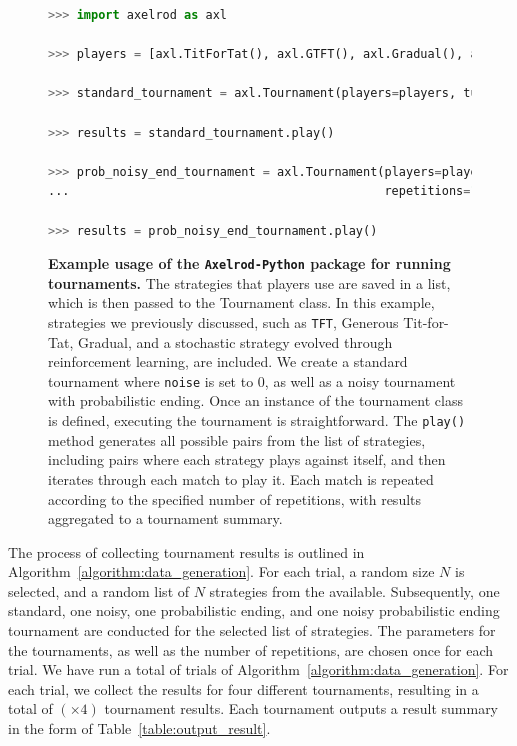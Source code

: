 \documentclass{article}
\newcommand{\uniquenumberofseeds}{}
\newcommand{\numberofalltournaments}{}
\newcommand{\numberofstrategies}{}
\def\axelrod{\texttt{Axelrod-Python}}
\def\TFT{\texttt{TFT}}
\begin{document}
\begin{figure}
\begin{lstlisting}[language=Python]
>>> import axelrod as axl

>>> players = [axl.TitForTat(), axl.GTFT(), axl.Gradual(), axl.EvolvedLookerUp2_2_2()]

>>> standard_tournament = axl.Tournament(players=players, turns=50, repetitions=10, noise=0)

>>> results = standard_tournament.play()

>>> prob_noisy_end_tournament = axl.Tournament(players=players, prob_end=0.5,
...                                            repetitions=10, noise=0.001)

>>> results = prob_noisy_end_tournament.play()
\end{lstlisting}
\caption{{\bf Example usage of the \axelrod{} package for running tournaments.}
The strategies that players use are saved in a list, which is then passed to the
Tournament class. In this example, strategies we previously discussed, such as \TFT, Generous Tit-for-Tat, Gradual, and a stochastic strategy
evolved through reinforcement learning, are included. We create a standard
tournament where \texttt{noise} is set to 0, as
well as a noisy tournament with probabilistic ending. Once an instance of the
tournament class is defined, executing the tournament is straightforward. The \texttt{play()}
method generates all possible pairs from the list of strategies, including
pairs where each strategy plays against itself, and then iterates through each
match to play it. Each match is repeated according to the specified number of
repetitions, with results aggregated to a tournament summary.}\label{fig:axelrod_code}
\end{figure}

The process of collecting tournament results is outlined in
Algorithm~\ref{algorithm:data_generation}. For each trial, a random size \(N\)
is selected, and a random list of \(N\) strategies from the \numberofstrategies
available. Subsequently, one standard, one noisy, one probabilistic ending, and
one noisy probabilistic ending tournament are conducted for the selected list of
strategies. The parameters for the tournaments, as well as the number of
repetitions, are chosen once for each trial. We have run a total of
\uniquenumberofseeds trials of Algorithm~\ref{algorithm:data_generation}. For
each trial, we collect the results for four different tournaments, resulting in
a total of \numberofalltournaments $(\uniquenumberofseeds \times 4)$ tournament
results. Each tournament outputs a result summary in the form of
Table~\ref{table:output_result}.
\end{document}
